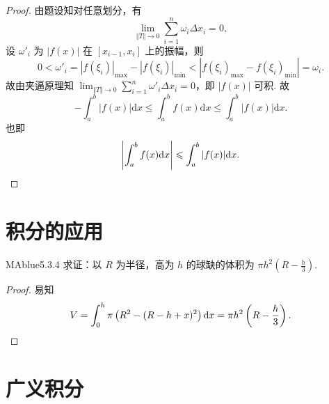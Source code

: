 \begin{proof}
    由题设知对任意划分，有
    \[
        \lim_{\Vert T \Vert \to 0} \sum_{i=1}^n \omega_i \Delta x_i = 0,
    \]
    设 $\omega'_i$ 为 $|f(x)|$ 在 $[x_{i-1}, x_i]$ 上的振幅，则
    \[
        0 < \omega'_i = |f(\xi_i)|_{\max} - |f(\xi_i)|_{\min} < |f(\xi_i)_{\max} - f(\xi_i)_{\min}| = \omega_i.
    \]
    故由夹逼原理知 $\lim_{\Vert T \Vert \to 0} \sum_{i=1}^n \omega'_i \Delta x_i = 0$，即 $|f(x)|$ 可积. 故
    \[
        -\int_a^b |f(x)| \mathrm dx \leqslant \int_a^b f(x) \mathrm dx \leqslant \int_a^b |f(x)| \mathrm dx.
    \]
    也即
    \[
        \left| \int_a^b f(x) \mathrm dx \right| \leqslant \int_a^b |f(x)| \mathrm dx. \qedhere
    \]
\end{proof}

\section{积分的应用}

\begin{problem}{MAblue}{5.3.4}
    求证：以 $R$ 为半径，高为 $h$ 的球缺的体积为 $\pi h^2 \left( R - \frac h 3 \right)$.
\end{problem}

\begin{proof}
    易知
    \[
        V = \int_0^h \pi \left( R^2 - (R-h+x)^2 \right) \mathrm dx = \pi h^2 \left( R - \frac h 3 \right). \qedhere
    \]
\end{proof}

\section{广义积分}


